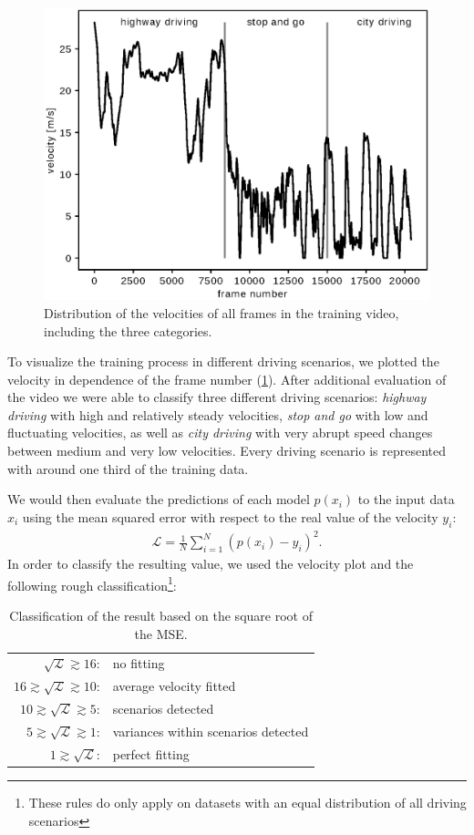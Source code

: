 \documentclass[conference]{IEEEtran}
\begin{document}
\begin{figure}[ht]
	\vspace{-0.25cm}
	\centering
	\includegraphics[width=0.7\columnwidth]{./imgs/plot_speed_time_new_splitting.eps}
	\caption{Distribution of the velocities of all frames in the training video, including the three categories.}
	\label{fig:SpeedPerFrameDistributionNewSplitting}
	\vspace{-0.25cm}
\end{figure}

To visualize the training process in different driving scenarios, we plotted the velocity in dependence of the frame number (\cref{fig:SpeedPerFrameDistributionNewSplitting}). After additional evaluation of the video we were able to classify three different driving scenarios: \emph{highway driving} with high and relatively steady velocities, \emph{stop and go} with low and fluctuating velocities, as well as \emph{city driving} with very abrupt speed changes between medium and very low velocities. Every driving scenario is represented with around one third of the training data.

We would then evaluate the predictions of each model $p(x_i)$ to the input data $x_i$ using the mean squared error with respect to the real value of the velocity $y_i$:
\begin{align*}
	\mathcal{L} = \frac{1}{N} \sum_{i=1}^{N} (p(x_i) - y_i)^2.
\end{align*}
In order to classify the resulting value, we used the velocity plot and the 
following rough classification\footnote{These rules do only apply on datasets with an equal distribution 
of all driving scenarios}:
\begin{table}[h!]
\normalsize
\centering
\begin{tabular}{r l}
$\sqrt{\mathcal{L}} \gtrsim 16$: & no fitting\\
$16 \gtrsim \sqrt{\mathcal{L}} \gtrsim 10$: & average velocity fitted\\
$10 \gtrsim \sqrt{\mathcal{L}} \gtrsim 5$: & scenarios detected\\
$5 \gtrsim \sqrt{\mathcal{L}} \gtrsim 1$: & variances within scenarios detected\\
$1 \gtrsim \sqrt{\mathcal{L}}$: & perfect fitting
\end{tabular}
\caption{Classification of the result based on the square root of the MSE.}
\end{table}
\end{document}
